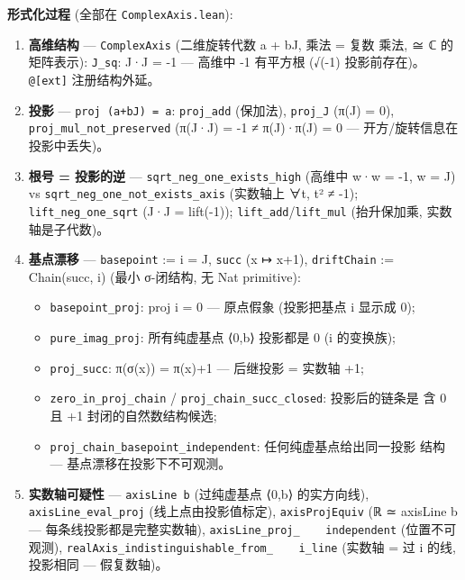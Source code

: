 \documentclass[
]{article}
\providecommand{\tightlist}{%
  \setlength{\itemsep}{0pt}\setlength{\parskip}{0pt}}
\begin{document}
\textbf{形式化过程} (全部在 \texttt{ComplexAxis.lean}):

\begin{enumerate}
\def\labelenumi{\arabic{enumi}.}
\tightlist
\item
  \textbf{高维结构} --- \texttt{ComplexAxis} (二维旋转代数 a + bJ, 乘法
  = 复数 乘法, ≅ ℂ 的矩阵表示): \texttt{J\_sq}: J·J = -1 --- 高维中 -1
  有平方根 (√(-1) 投影前存在)。\texttt{@{[}ext{]}} 注册结构外延。
\item
  \textbf{投影} --- \texttt{proj\ (a+bJ)\ =\ a}: \texttt{proj\_add}
  (保加法), \texttt{proj\_J} (π(J) = 0),
  \texttt{proj\_mul\_not\_preserved} (π(J·J) = -1 ≠ π(J)·π(J) = 0 ---
  开方/旋转信息在投影中丢失)。
\item
  \textbf{根号 = 投影的逆} --- \texttt{sqrt\_neg\_one\_exists\_high}
  (高维中 w·w = -1, w = J) vs \texttt{sqrt\_neg\_one\_not\_exists\_axis}
  (实数轴上 ∀t, t² ≠ -1); \texttt{lift\_neg\_one\_sqrt} (J·J =
  lift(-1)); \texttt{lift\_add}/\texttt{lift\_mul} (抬升保加乘,
  实数轴是子代数)。
\item
  \textbf{基点漂移} --- \texttt{basepoint} := i = J, \texttt{succ} (x ↦
  x+1), \texttt{driftChain} := Chain(succ, i) (最小 σ-闭结构, 无 Nat
  primitive):

  \begin{itemize}
  \tightlist
  \item
    \texttt{basepoint\_proj}: proj i = 0 --- 原点假象 (投影把基点 i
    显示成 0);
  \item
    \texttt{pure\_imag\_proj}: 所有纯虚基点 ⟨0,b⟩ 投影都是 0 (i
    的变换族);
  \item
    \texttt{proj\_succ}: π(σ(x)) = π(x)+1 --- 后继投影 = 实数轴 +1;
  \item
    \texttt{zero\_in\_proj\_chain} / \texttt{proj\_chain\_succ\_closed}:
    投影后的链条是 含 0 且 +1 封闭的自然数结构候选;
  \item
    \texttt{proj\_chain\_basepoint\_independent}:
    任何纯虚基点给出同一投影 结构 --- 基点漂移在投影下不可观测。
  \end{itemize}
\item
  \textbf{实数轴可疑性} --- \texttt{axisLine\ b} (过纯虚基点 ⟨0,b⟩
  的实方向线), \texttt{axisLine\_eval\_proj} (线上点由投影值标定),
  \texttt{axisProjEquiv} (ℝ ≃ axisLine b --- 每条线投影都是完整实数轴),
  \texttt{axisLine\_proj\_\ \ \ \ independent} (位置不可观测),
  \texttt{realAxis\_indistinguishable\_from\_\ \ \ \ i\_line} (实数轴 =
  过 i 的线, 投影相同 --- 假复数轴)。
\end{enumerate}
\end{document}
